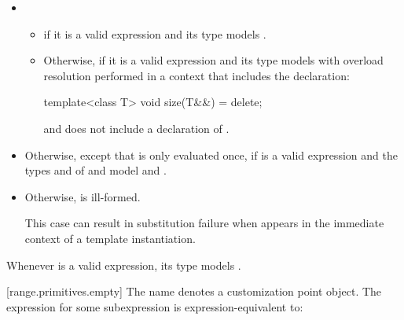 \begin{addedblock}
\begin{itemize}
\item
  \begin{itemize}
  \item
     
    if it is a valid expression and its type  models
     .

  \item
    Otherwise, 
    if it is a valid expression and its type  models
     with overload resolution
    performed in a context that includes the declaration:
    \begin{codeblock}
    template<class T> void size(T&&) = delete;
    \end{codeblock}
    and does not include a declaration of .
  \end{itemize}

\item
  Otherwise, 
  except that  is only evaluated once, if   is a valid expression and
  the types  and  of  and
   model
   and
  .

\item
  Otherwise,  is ill-formed.
  {\color{newclr}
  \begin{note}
  This case can result in substitution failure when 
  appears in the immediate context of a template instantiation.
  \end{note}
  } %
\end{itemize}

\pnum
\begin{note}
Whenever  is a valid expression, its
type models .
\end{note}

[range.primitives.empty]{}
\pnum
The name  denotes a customization point
object. The expression
 for some subexpression  is
expression-equivalent to:


\end{addedblock}
